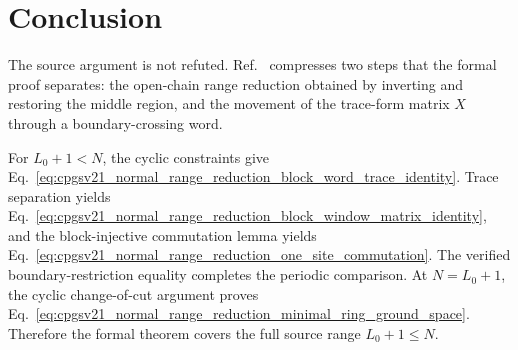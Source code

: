 \documentclass{article}
\begin{document}
\section{Conclusion}

The source argument is not refuted. Ref.~\cite{Cirac2021Matrix} compresses two
steps that the formal proof separates: the open-chain range reduction obtained
by inverting and restoring the middle region, and the movement of the
trace-form matrix $X$ through a boundary-crossing word.

For $L_0+1<N$, the cyclic constraints give
Eq.~\ref{eq:cpgsv21_normal_range_reduction_block_word_trace_identity}. Trace
separation yields
Eq.~\ref{eq:cpgsv21_normal_range_reduction_block_window_matrix_identity}, and
the block-injective commutation lemma yields
Eq.~\ref{eq:cpgsv21_normal_range_reduction_one_site_commutation}. The verified
boundary-restriction equality completes the periodic comparison. At
$N=L_0+1$, the cyclic change-of-cut argument proves
Eq.~\ref{eq:cpgsv21_normal_range_reduction_minimal_ring_ground_space}.
Therefore the formal theorem covers the full source range $L_0+1\leq N$.



\end{document}
